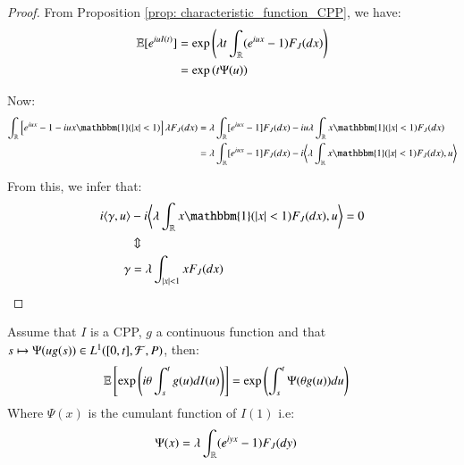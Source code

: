 \begin{proof}

From Proposition \ref{prop: characteristic_function_CPP}, we have: 
\begin{align*}
\mathbb{E}[e^{iuI(t)}] &= \exp\left(
\lambda t \int_{\mathbb{R}}(e^{iux}-1)F_{J}(dx)
\right) \\ 
&= 
\exp\left(t\Psi(u)\right)
\end{align*}

Now: 
\begin{align*}
\int_{\R}\left[
e^{iux}-1-iux\mathbbm{1}(|x|<1)
\right]\lambda F_{J}(dx) 
&= 
\lambda \int_{\R}[e^{iux}-1]F_{J}(dx) - iu\lambda\int_{\R}x\mathbbm{1}(|x|<1)F_{J}(dx) \\ 
&= 
\lambda \int_{\R}[e^{iux}-1]F_{J}(dx) - i \bigg{\langle} \lambda\int_{\R}x\mathbbm{1}(|x|<1)F_{J}(dx), u \bigg{\rangle}
\end{align*}

From this, we infer that: 
\begin{align*}
i\langle \gamma, u \rangle &- i\bigg{\langle} \lambda \int_{\R}x\mathbbm{1}(|x|<1)F_{J}(dx), u \bigg{\rangle}
= 0 \\ 
&\Updownarrow \\ 
\gamma &= \lambda \int_{|x|<1}xF_{J}(dx)
\end{align*}

\end{proof}

\begin{proposition}
\label{prop: Integral_g(s)dI(s)}
Assume that $I$ is a CPP, $g$ a continuous function and that 
$s\mapsto \Psi(ug(s)) \in L^{1}([0,t], \mathcal{F}, P)$, then: 
\begin{align*}
\mathbb{E}\left[
\exp\left(
i\theta\int_{s}^{t}g(u)dI(u)
\right)
\right] 
&= 
\exp\left(
\int_{s}^{t}\Psi(\theta g(u))du
\right)
\end{align*}
Where $\Psi(x)$ is the cumulant function of $I(1)$ i.e: 
\begin{align*}
\Psi(x) &= 
\lambda \int_{\mathbb{R}}(e^{iyx}-1)F_{J}(dy)
\end{align*}
\end{proposition}

